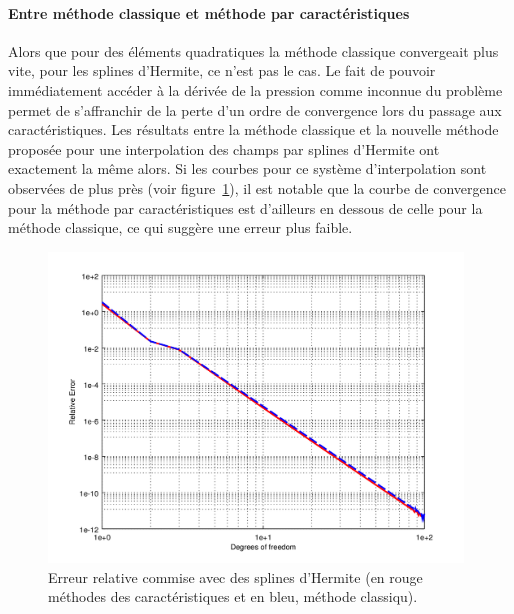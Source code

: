 \paragraph{Entre méthode classique et méthode par caractéristiques}
Alors que pour des éléments quadratiques la méthode classique convergeait plus vite, pour les splines d'Hermite, ce
n'est pas le cas.
Le fait de pouvoir immédiatement accéder à la dérivée de la pression comme inconnue du problème permet de s'affranchir
de la perte d'un ordre de convergence lors du passage aux caractéristiques. Les résultats entre la méthode classique et
la nouvelle méthode proposée pour une interpolation des champs par splines d'Hermite ont exactement la même alors. Si
les courbes pour ce système d'interpolation sont observées de plus près (voir figure~\ref{fig:herm_seul}), il est
notable que la courbe de convergence pour la méthode par caractéristiques est d'ailleurs en dessous de celle pour la
méthode classique, ce qui suggère une erreur plus faible.

\begin{figure}[!ht]
	\centering
	\includegraphics[width=11cm]{part4/figs/herm_seul.png}
	\caption{\label{fig:herm_seul}Erreur relative commise avec des splines d'Hermite (en rouge méthodes des
    caractéristiques et en bleu, méthode classiqu).}
\end{figure}
